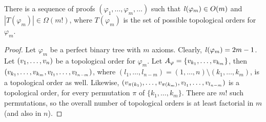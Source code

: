 \begin{theorem}
\label{theorem:enumeration}
There is a sequence of proofs $(\varphi_1,\ldots,\varphi_m,\ldots)$ such that $\mathit{l}(\varphi_m) \in O(m)$ and $|T(\varphi_m)| \in \Omega(m!)$, where $T(\varphi_m)$ is the set of possible topological orders for $\varphi_m$.
\end{theorem}
\begin{proof}
Let $\varphi_m$ be a perfect binary tree with $m$ axioms. Clearly, $\mathit{l}(\varphi_m) = 2m-1$.
Let $(v_1,\ldots,v_n)$ be a topological order for $\varphi_m$. 
Let $A_{\varphi} = \{v_{k_1},\ldots,v_{k_m}\}$, then\\ $(v_{k_1},\ldots,v_{k_m},v_{l_1},\ldots,v_{l_{n-m}})$, where $(l_1,\ldots,l_{n-m}) = (1,\ldots,n) \setminus (k_1,\ldots,k_m)$, is a topological order as well. 
Likewise, $(v_{\pi({k_1})},\ldots,v_{\pi({k_m})},v_{l_1},\ldots,v_{l_{n-m}})$ is a topological order, for every permutation $\pi$ of $\{k_1,\ldots,k_m\}$. There are $m!$ such permutations, so the overall number of topological orders is at least factorial in $m$ (and also in $n$).
\end{proof}

